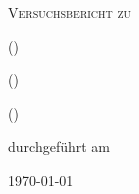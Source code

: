 
\makeatletter
\newcommand*{\protokollemailparse}[1]{%
	\@for\@tempa:=#1\do{%
		\normalsize\email{\@tempa}\\
	}%
}
\makeatother

\begin{titlepage}
	\centering
	{\scshape\LARGE Versuchsbericht zu \par}
	\vspace{1cm}
	{\scshape\huge \varName\par}
	\vspace{2.5cm}
	{\LARGE \varGruppe\par}
	\vspace{0.5cm}
	{\large \varNameA {} (\varEmailA) \par}
	{\large \varNameB {} (\varEmailB) \par}
	{\large \varNameC {} (\varEmailC) \par}
	\vfill
	durchgeführt am \varDatum\par
	{\large \varBetreuer}
	\vfill
	{\large \today\par}
\end{titlepage}


\maketitle
